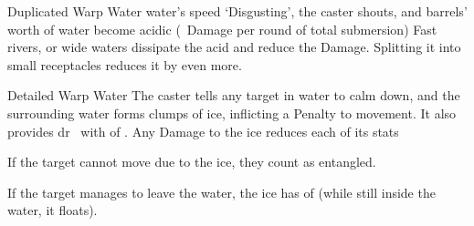 \ifodd\value{diceNo}

  {Duplicated}%
  {Warp}%
  {Water}%
  {water's speed}%
  {`Disgusting', the caster shouts, and  barrels' worth of water become acidic (\showDam~Damage per \gls{round} of total submersion)}%
  {
    Fast rivers, or wide waters dissipate the acid and reduce the Damage.
	Splitting it into small receptacles reduces it by even more.%
  }

\else

  {Detailed}%
  {Warp}%
  {Water}%
  {}%
  {The caster tells any target in water to calm down, and the surrounding water forms clumps of ice, inflicting a  Penalty to movement.
  It also provides \gls{dr}~ with  of .
  Any Damage to the ice reduces each of its stats}%
  {
  If the target cannot move due to the ice, they count as entangled.

  If the target manages to leave the water, the ice has  of  (while still inside the water, it floats).}

\fi
{}
